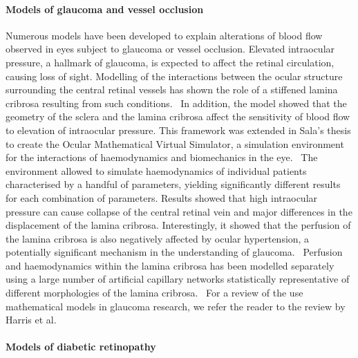 \documentclass{article}
\begin{document}
\paragraph*{Models of glaucoma and vessel occlusion}

Numerous models have been developed to explain alterations of blood flow observed in eyes subject to glaucoma or vessel occlusion.\cite{Chuangsuwanich_2016,Guidoboni_2014,Sala_2018,Sala_2020}
Elevated intraocular pressure, a hallmark of glaucoma, is expected to affect the retinal circulation, causing loss of sight.
Modelling of the interactions between the ocular structure surrounding the central retinal vessels has shown the role of a stiffened lamina cribrosa resulting from such conditions.~\cite{Guidoboni_2014}
In addition, the model showed that the geometry of the sclera and the lamina cribrosa affect the sensitivity of blood flow to elevation of intraocular pressure.
This framework was extended in Sala's thesis to create the Ocular Mathematical Virtual Simulator, a simulation environment for the interactions of haemodynamics and biomechanics in the eye.~\cite{Sala_2018,Sala_2020}
The environment allowed to simulate haemodynamics of individual patients characterised by a handful of parameters, yielding significantly different results for each combination of parameters.
Results showed that high intraocular pressure can cause collapse of the central retinal vein and major differences in the displacement of the lamina cribrosa.
Interestingly, it showed that the perfusion of the lamina cribrosa is also negatively affected by ocular hypertension, a potentially significant mechanism in the understanding of glaucoma.~\cite{Sala_2020}
Perfusion and haemodynamics within the lamina cribrosa has been modelled separately using a large number of artificial capillary networks statistically representative of different morphologies of the lamina cribrosa.~\cite{Chuangsuwanich_2016}
For a review of the use mathematical models in glaucoma research, we refer the reader to the review by Harris et al.~\cite{Harris_2013}

\paragraph*{Models of diabetic retinopathy}
\end{document}
